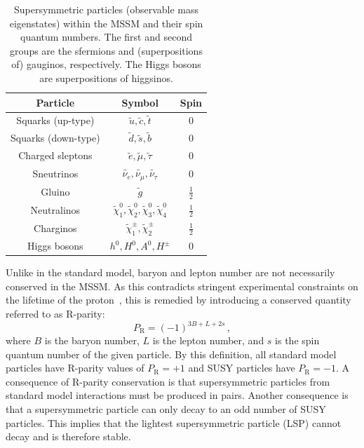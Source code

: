 \begin{table}
\centering
\begin{tabular}{ccc}
\hline
Particle & Symbol & Spin \\
\hline
Squarks (up-type)   & $\tilde{u},\tilde{c},\tilde{t}$ & 0 \\
Squarks (down-type) & $\tilde{d},\tilde{s},\tilde{b}$ & 0 \\
Charged sleptons & $\tilde{e},\tilde{\mu},\tilde{\tau}$ & 0 \\
Sneutrinos & $\widetilde{\nu_{e}},\widetilde{\nu_{\mu}},\widetilde{\nu_{\tau}}$ 
& 0 \\
\hline
Gluino & $\tilde{g}$ & $\frac{1}{2}$ \\
Neutralinos &
$\widetilde{\chi}_1^0,\widetilde{\chi}_2^0,\widetilde{\chi}_3^0,\widetilde{\chi}_4^0$
& $\frac{1}{2}$ \\
Charginos & $\widetilde{\chi}_1^{\pm},\widetilde{\chi}_2^{\pm}$ &
$\frac{1}{2}$ \\
\hline
Higgs bosons & $h^0,H^0,A^0,H^{\pm}$ & 0 \\
\hline
\end{tabular}
\caption{Supersymmetric particles (observable mass eigenstates) within the MSSM 
and their spin quantum numbers. The first and second groups are the sfermions 
and (superpositions of) gauginos, respectively. The Higgs bosons are 
superpositions of higgsinos.}
\label{tab:mssm}
\end{table}

Unlike in the standard model, baryon and lepton number are not necessarily 
conserved in the MSSM. As this contradicts stringent experimental constraints 
on the lifetime of the proton~\cite{proton-decay}, this is remedied by 
introducing a conserved quantity referred to as R-parity:
\begin{equation}
P_{\mathrm R} = (-1)^{3B+L+2s} \, ,
\end{equation}
where $B$ is the baryon number, $L$ is the lepton number, and $s$ is the spin 
quantum number of the given particle. By this definition, all standard model 
particles have R-parity values of $P_{\mathrm R} = +1$ and SUSY particles have 
$P_{\mathrm R} = -1$. A consequence of R-parity conservation is that 
supersymmetric particles from standard model interactions must be produced in 
pairs. Another consequence is that a supersymmetric particle can only decay to 
an odd number of SUSY particles. This implies that the lightest supersymmetric 
particle (LSP) cannot decay and is therefore stable.

